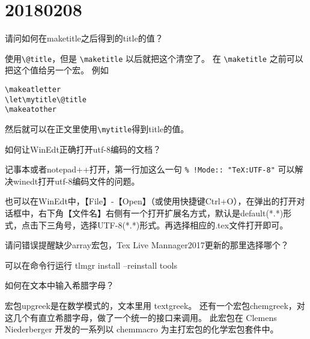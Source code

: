 \documentclass[QAofGroup.tex]{subfiles}
\begin{document}
%
%

\chapter{20180208}\label{ch180208}

\begin{qst}\label{Q2018020801}
 请问如何在maketitle之后得到的title的值？
\end{qst}
\ans 使用\verb|\@title|，但是 \verb|\maketitle| 以后就把这个清空了。
在 \verb|\maketitle| 之前可以把这个值给另一个宏。
例如
\begin{verbatim}
\makeatletter
\let\mytitle\@title
\makeatother
\end{verbatim}
然后就可以在正文里使用\verb|\mytitle|得到title的值。

\begin{qst}\label{Q2018020802}
 如何让WinEdt正确打开utf-8编码的文档？
\end{qst}
\ans 记事本或者notepad++打开，第一行加这么一句
\verb|% !Mode:: "TeX:UTF-8"|
可以解决winedt打开utf-8编码文件的问题。

也可以在WinEdt中，【File】-【Open】（或使用快捷键Ctrl+O），在弹出的打开对话框中，右下角【文件名】右侧有一个打开扩展名方式，默认是default(*.*)形式，点击下三角号，选择UTF-8(*.*)形式。再选择相应的.tex文件打开即可。

\begin{qst}\label{Q2018020803}
 请问错误提醒缺少array宏包，Tex Live Mannager2017更新的那里选择哪个？
\end{qst}
\ans 可以在命令行运行 tlmgr install --reinstall tools

\begin{qst}\label{Q2018020804}
 如何在文本中输入希腊字母？
\end{qst}
\ans 宏包upgreek是在数学模式的，文本里用 textgreek。
还有一个宏包chemgreek，对这几个有直立希腊字母，做了一个统一的接口来调用。 此宏包在 Clemens Niederberger 开发的一系列以 chemmacro 为主打宏包的化学宏包套件中。
\end{document}
